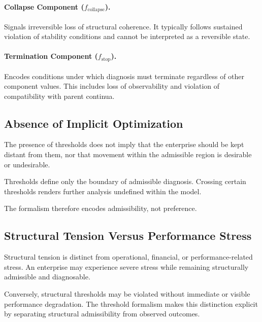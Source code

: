 \paragraph{Collapse Component ($f_{\text{collapse}}$).}
Signals irreversible loss of structural coherence.
It typically follows sustained violation of stability conditions and
cannot be interpreted as a reversible state.

\paragraph{Termination Component ($f_{\text{stop}}$).}
Encodes conditions under which diagnosis must terminate regardless of
other component values.
This includes loss of observability and violation of compatibility with
parent continua.

\subsection{Absence of Implicit Optimization}

The presence of thresholds does not imply that the enterprise should be
kept distant from them, nor that movement within the admissible region
is desirable or undesirable.

Thresholds define only the boundary of admissible diagnosis.
Crossing certain thresholds renders further analysis undefined within
the model.

The formalism therefore encodes admissibility, not preference.

\subsection{Structural Tension Versus Performance Stress}

Structural tension is distinct from operational, financial, or
performance-related stress.
An enterprise may experience severe stress while remaining structurally
admissible and diagnosable.

Conversely, structural thresholds may be violated without immediate or
visible performance degradation.
The threshold formalism makes this distinction explicit by separating
structural admissibility from observed outcomes.

